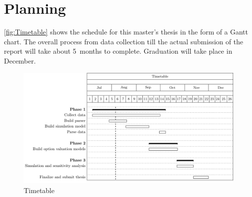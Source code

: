 \chapter{Planning}
\autoref{fig:Timetable} shows the schedule for this master's thesis in the form of a Gantt chart. The overall process from data collection till the actual submission of the report will take about 5~months to complete. Graduation will take place in December.

\begin{figure}[h]
\centering
\includegraphics[width=1\textwidth]{figures/Timetable}
\caption{Timetable}
\label{fig:Timetable}
\end{figure}